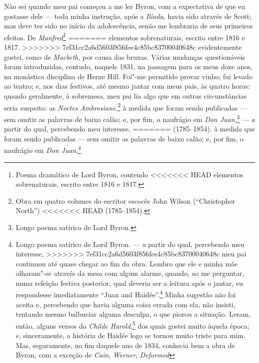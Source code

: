 {{{{{{{{{{{{{{{{{{{{{{{{{{{{{{{{{{Não sei quando meu pai começou a me ler Byron, com a expectativa de que
eu gostasse dele --- toda minha instrução, após a \textit{Ilíada}, havia
sido através de Scott; mas deve ter sido no início da adolescência,
senão me lembraria de seus primeiros efeitos. De
\textit{Manfred}\footnote{Poema dramático de Lord Byron, contendo
<<<<<<< HEAD
  elementos sobrenaturais, escrito entre 1816 e 1817.}
=======
  elementos sobrenaturais, escrito entre 1816 e 1817. 
>>>>>>> 7ef31cc2a6d5603f856fee4c85bc83700040648c
evidentemente gostei, como de \textit{Macbeth}, por causa das bruxas.
Várias mudanças questionáveis foram introduzidas, contudo, naquele 1831,
na passagem para os meus doze anos, na monástica disciplina de Herne
Hill. Foi"-me permitido provar vinho; fui levado ao teatro; e, nos dias
festivos, até mesmo jantar com meus pais, às quatro horas: quando
geralmente, à sobremesa, meu pai lia algo que em outras circunstâncias
seria suspeito: as \textit{Noctes} \textit{Ambrosiane},\footnote{Obra em
  quatro volumes do escritor escocês John Wilson (``Christopher North'')
<<<<<<< HEAD
  (1785--1854).} à medida que foram sendo publicadas ---
sem omitir as palavras de baixo calão; e, por fim, o naufrágio em
\textit{Don Juan},\footnote{Longo poema satírico de Lord Byron.} --- \textit{a} partir do qual, percebendo meu interesse,
=======
  (1785--1854).  à medida que foram sendo publicadas ---
sem omitir as palavras de baixo calão; e, por fim, o naufrágio em
\textit{Don Juan},\footnote{Longo poema satírico de Lord Byron.  --- \textit{a} partir do qual, percebendo meu interesse,
>>>>>>> 7ef31cc2a6d5603f856fee4c85bc83700040648c
meu pai continuou até quase chegar ao fim da obra. Lembro que ele e
minha mãe olharam"-se através da mesa com algum alarme, quando, ao me
perguntar, numa refeição festiva posterior, qual deveria ser a leitura
após o jantar, eu respondesse imediatamente ``Juan and Haidée''.\footnote{\textit{The
  Poets's Song to Don Juan and Haydée}: título de um poema de cunho
<<<<<<< HEAD
  erótico da autoria de Lord Byron.} Minha sugestão
não foi aceita e, percebendo que havia alguma coisa errada com ela, não
insisti, tentando mesmo balbuciar alguma desculpa, o que piorou a
situação. Leram, então, alguns versos do \textit{Childe Harold},\footnote{\textit{Childe
  Harold' Pilgrimage}: título de um famoso poema narrativo de Lord Byron.} dos quais gostei muito àquela época; e,
sinceramente, a história de Haidée logo se tornou muito triste para mim.
Mas, seguramente, no fim daquele ano de 1834, conhecia bem a obra de
Byron, com a exceção de \textit{Cain}, \textit{Werner}, \textit{Deformed}
}}}}}}}}}}}}}}}}}}}}}}}}}}}}}}}}}}}
